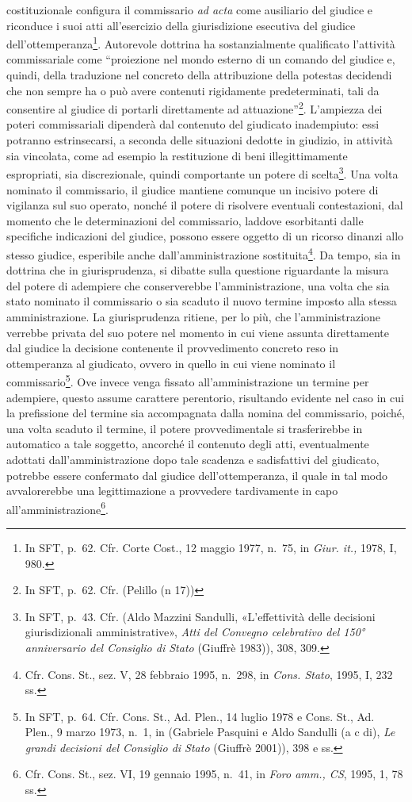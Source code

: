 \documentclass[12pt,it,a4paper,]{report}
\begin{document}
costituzionale configura il commissario \emph{ad acta} come ausiliario
del giudice e riconduce i suoi atti all'esercizio della giurisdizione
esecutiva del giudice dell'ottemperanza\footnote{In SFT, p.~62. Cfr.
  Corte Cost., 12 maggio 1977, n.~75, in \emph{Giur. it.,} 1978, I, 980.}.
Autorevole dottrina ha sostanzialmente qualificato l'attività
commissariale come ``proiezione nel mondo esterno di un comando del
giudice e, quindi, della traduzione nel concreto della attribuzione
della potestas decidendi che non sempre ha o può avere contenuti
rigidamente predeterminati, tali da consentire al giudice di portarli
direttamente ad attuazione''\footnote{In SFT, p.~62. Cfr. (Pelillo (n
  17))}. L'ampiezza dei poteri commissariali dipenderà dal contenuto del
giudicato inadempiuto: essi potranno estrinsecarsi, a seconda delle
situazioni dedotte in giudizio, in attività sia vincolata, come ad
esempio la restituzione di beni illegittimamente espropriati, sia
discrezionale, quindi comportante un potere di scelta\footnote{In SFT,
  p.~43. Cfr. (Aldo Mazzini Sandulli, {«L'effettività delle decisioni
  giurisdizionali amministrative»}, \emph{Atti del Convegno celebrativo
  del 150° anniversario del Consiglio di Stato} (Giuffrè 1983)), 308,
  309.}. Una volta nominato il commissario, il giudice mantiene comunque
un incisivo potere di vigilanza sul suo operato, nonché il potere di
risolvere eventuali contestazioni, dal momento che le determinazioni del
commissario, laddove esorbitanti dalle specifiche indicazioni del
giudice, possono essere oggetto di un ricorso dinanzi allo stesso
giudice, esperibile anche dall'amministrazione sostituita\footnote{Cfr.
  Cons. St., sez. V, 28 febbraio 1995, n.~298, in \emph{Cons. Stato},
  1995, I, 232 ss.}. Da tempo, sia in dottrina che in giurisprudenza, si
dibatte sulla questione riguardante la misura del potere di adempiere
che conserverebbe l'amministrazione, una volta che sia stato nominato il
commissario o sia scaduto il nuovo termine imposto alla stessa
amministrazione. La giurisprudenza ritiene, per lo più, che
l'amministrazione verrebbe privata del suo potere nel momento in cui
viene assunta direttamente dal giudice la decisione contenente il
provvedimento concreto reso in ottemperanza al giudicato, ovvero in
quello in cui viene nominato il commissario\footnote{In SFT, p.~64. Cfr.
  Cons. St., Ad. Plen., 14 luglio 1978 e Cons. St., Ad. Plen., 9 marzo
  1973, n.~1, in (Gabriele Pasquini e Aldo Sandulli (a c di), \emph{Le
  grandi decisioni del Consiglio di Stato} (Giuffrè 2001)), 398 e ss.}.
Ove invece venga fissato all'amministrazione un termine per adempiere,
questo assume carattere perentorio, risultando evidente nel caso in cui
la prefissione del termine sia accompagnata dalla nomina del
commissario, poiché, una volta scaduto il termine, il potere
provvedimentale si trasferirebbe in automatico a tale soggetto, ancorché
il contenuto degli atti, eventualmente adottati dall'amministrazione
dopo tale scadenza e sadisfattivi del giudicato, potrebbe essere
confermato dal giudice dell'ottemperanza, il quale in tal modo
avvalorerebbe una legittimazione a provvedere tardivamente in capo
all'amministrazione\footnote{Cfr. Cons. St., sez. VI, 19 gennaio 1995,
  n.~41, in \emph{Foro amm., CS}, 1995, 1, 78 ss.}.
\end{document}
